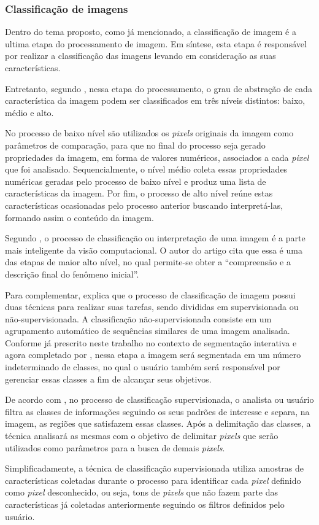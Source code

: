 \subsubsection{{Classificação de imagens}}

Dentro do tema proposto, como já mencionado, a classificação de imagem é a ultima etapa do processamento de imagem. Em síntese, esta etapa é responsável por realizar a classificação das imagens levando em consideração as suas características.

Entretanto, segundo , nessa etapa do processamento, o grau de abstração de cada característica da imagem podem ser classificados em três níveis distintos: baixo, médio e alto.

No processo de baixo nível são utilizados os \textit{pixels} originais da imagem como parâmetros de comparação, para que no final do processo seja gerado propriedades da imagem, em forma de valores numéricos, associados a cada \textit{pixel} que foi analisado. Sequencialmente, o nível médio coleta essas propriedades numéricas geradas pelo processo de baixo nível e produz uma lista de características da imagem. Por fim, o processo de alto nível reúne estas características ocasionadas pelo processo anterior buscando interpretá-las, formando assim o conteúdo da imagem.

Segundo , o processo de classificação ou interpretação de uma imagem é a parte mais inteligente da visão computacional. O autor do artigo cita que essa é uma das etapas de maior alto nível, no qual permite-se obter a “compreensão e a descrição final do fenômeno inicial”.

Para complementar,  explica que o processo de classificação de imagem possui duas técnicas para realizar suas tarefas, sendo divididas em supervisionada ou não-supervisionada. A classificação não-supervisionada consiste em um agrupamento automático de sequências similares de uma imagem analisada. Conforme já prescrito neste trabalho no contexto de segmentação interativa e agora completado por , nessa etapa a imagem será segmentada em um número indeterminado de classes, no qual o usuário também será responsável por gerenciar essas classes a fim de alcançar seus objetivos.

De acordo com , no processo de classificação supervisionada, o analista ou usuário filtra as classes de informações seguindo os seus padrões de interesse e separa, na imagem, as regiões que satisfazem essas classes. Após a delimitação das classes, a técnica analisará as mesmas com o objetivo de delimitar \textit{pixels} que serão utilizados como parâmetros para a busca de demais \textit{pixels}.

Simplificadamente, a técnica de classificação supervisionada utiliza amostras de características coletadas durante o processo para identificar cada \textit{pixel} definido como \textit{pixel} desconhecido, ou seja, tons de \textit{pixels} que não fazem parte das características já coletadas anteriormente seguindo os filtros definidos pelo usuário.